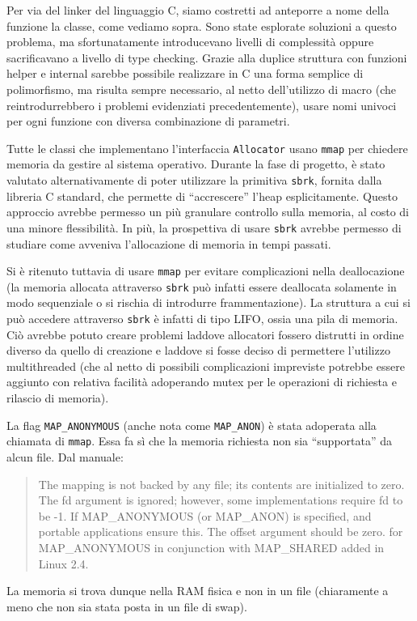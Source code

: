 Per via del linker del linguaggio C, siamo costretti ad anteporre a nome della funzione la classe, come vediamo sopra. Sono state esplorate soluzioni a questo problema, ma sfortunatamente introducevano livelli di complessità oppure sacrificavano a livello di type checking. Grazie alla duplice struttura con funzioni helper e internal sarebbe possibile realizzare in C una forma semplice di polimorfismo, ma risulta sempre necessario, al netto dell’utilizzo di macro (che reintrodurrebbero i problemi evidenziati precedentemente), usare nomi univoci per ogni funzione con diversa combinazione di parametri.

Tutte le classi che implementano l’interfaccia \texttt{Allocator} usano \texttt{mmap} per chiedere memoria da gestire al sistema operativo. Durante la fase di progetto, è stato valutato alternativamente di poter utilizzare la primitiva \texttt{sbrk}, fornita dalla libreria C standard, che permette di “accrescere” l’heap esplicitamente. Questo approccio avrebbe permesso un più granulare controllo sulla memoria, al costo di una minore flessibilità. In più, la prospettiva di usare \texttt{sbrk} avrebbe permesso di studiare come avveniva l’allocazione di memoria in tempi passati.

Si è ritenuto tuttavia di usare \texttt{mmap} per evitare complicazioni nella deallocazione (la memoria allocata attraverso \texttt{sbrk} può infatti essere deallocata solamente in modo sequenziale o si rischia di introdurre frammentazione). La struttura a cui si può accedere attraverso \texttt{sbrk} è infatti di tipo LIFO, ossia una pila di memoria. Ciò avrebbe potuto creare problemi laddove allocatori fossero distrutti in ordine diverso da quello di creazione e laddove si fosse deciso di permettere l’utilizzo multithreaded (che al netto di possibili complicazioni impreviste potrebbe essere aggiunto con relativa facilità adoperando mutex per le operazioni di richiesta e rilascio di memoria).

La flag \texttt{MAP\_ANONYMOUS} (anche nota come \texttt{MAP\_ANON}) è stata adoperata alla chiamata di \texttt{mmap}. Essa fa sì che la memoria richiesta non sia “supportata” da alcun file. Dal manuale:
\begin{quote}
  The mapping is not backed by any file; its contents are initialized to zero. The fd argument is ignored; however, some implementations require fd to be -1. If MAP\_ANONYMOUS (or MAP\_ANON) is specified, and portable applications ensure this. The offset argument should be zero. for MAP\_ANONYMOUS in conjunction with MAP\_SHARED added in Linux 2.4.
\end{quote}
La memoria si trova dunque nella RAM fisica e non in un file (chiaramente a meno che non sia stata posta in un file di swap).

